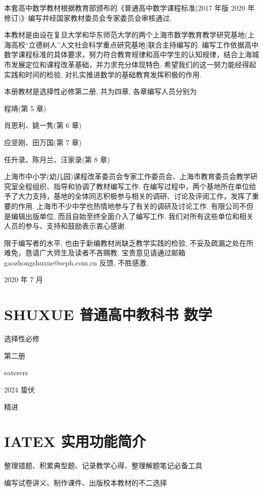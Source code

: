 \documentclass[10pt]{article}
\begin{document}
本套高中数学教材根据教育部颁布的《普通高中数学课程标准(2017 年版 2020 年修订)》编写并经国家教材委员会专家委员会审核通过.

本教材是由设在复旦大学和华东师范大学的两个上海市数学教育教学研究基地(上海高校“立德树人”人文社会科学重点研究基地)联合主持编写的. 编写工作依据高中数学课程标准的具体要求，努力符合教育规律和高中学生的认知规律，结合上海城市发展定位和课程改革基础，并力求充分体现特色. 希望我们的这一努力能经得起实践和时间的检验, 对扎实推进数学的基础教育发挥积极的作用.

本册教材是选择性必修第二册, 共为四章, 各章编写人员分别为

程靖(第 5 章)

肖恩利、姚一隽(第 6 章)

应坚刚、田万国(第 7 章)

任升录、陈月兰、汪家录(第 8 章)

上海市中小学(幼儿园)课程改革委员会专家工作委员会、上海市教育委员会教学研究室全程组织、指导和协调了教材编写工作. 在编写过程中，两个基地所在单位给予了大力支持，基地的全体同志积极参与相关的调研、讨论及评阅工作，发挥了重要的作用. 上海市不少中学也热情地参与了有关的调研及讨论工作. 有限公司不但是编辑出版单位, 而且自始至终全面介入了编写工作. 我们对所有这些单位和相关人员的参与、支持和鼓励表示衷心感谢.

限于编写者的水平, 也由于新编教材尚缺乏教学实践的检验, 不妥及疏漏之处在所难免，恳请广大师生及读者不吝赐教. 宝贵意见请通过邮箱 gaozhongshuxue@seph.com.cn 反馈, 不胜感激.

2020 年 7 月







\section*{SHUXUE 普通高中教科书 数学}

选择性必修

第二册

eaterers

2024 蛰伏

精进

\section*{IATEX 实用功能简介}

整理错题、积累典型题、记录教学心得、整理解题笔记必备工具

编写试卷讲义、制作课件、出版校本教材的不二选择
\end{document}

